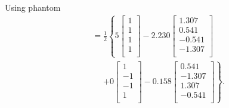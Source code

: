 \documentclass{article}
\begin{document}
        Using phantom
\begin{align*}
    &=
    \frac{1}{2} \left\{
    5
    \left[
    \begin{array}{c}
            1 \\ 1 \\ 1 \\ 1
    \\ \end{array}
    \right]
    - 2.230
    \left[
    \begin{array}{c}
            1.307 \\ 0.541 \\ -0.541  \\ -1.307
    \\ \end{array}
    \right] \right.\\
    &\mathrel{\phantom{=}} \left. +0
    \left[
    \begin{array}{c}
            1 \\ -1 \\ -1 \\ 1
    \\ \end{array}
    \right]
    -0.158
    \left[
    \begin{array}{c}
            0.541 \\ -1.307 \\ 1.307 \\ -0.541
    \\ \end{array}
    \right]
    \right\}.
    \end{align*}
\end{document}
